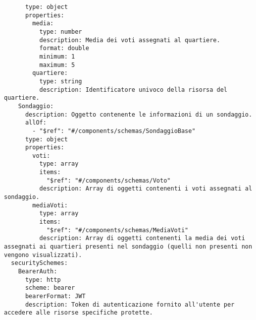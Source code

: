 \begin{verbatim}
      type: object
      properties:
        media:
          type: number
          description: Media dei voti assegnati al quartiere.
          format: double
          minimum: 1
          maximum: 5
        quartiere:
          type: string
          description: Identificatore univoco della risorsa del quartiere.
    Sondaggio:
      description: Oggetto contenente le informazioni di un sondaggio.
      allOf:
        - "$ref": "#/components/schemas/SondaggioBase"
      type: object
      properties:
        voti:
          type: array
          items:
            "$ref": "#/components/schemas/Voto"
          description: Array di oggetti contenenti i voti assegnati al sondaggio.
        mediaVoti:
          type: array
          items:
            "$ref": "#/components/schemas/MediaVoti"
          description: Array di oggetti contenenti la media dei voti assegnati ai quartieri presenti nel sondaggio (quelli non presenti non vengono visualizzati).
  securitySchemes:
    BearerAuth:
      type: http
      scheme: bearer
      bearerFormat: JWT
      description: Token di autenticazione fornito all'utente per accedere alle risorse specifiche protette.


\end{verbatim}
